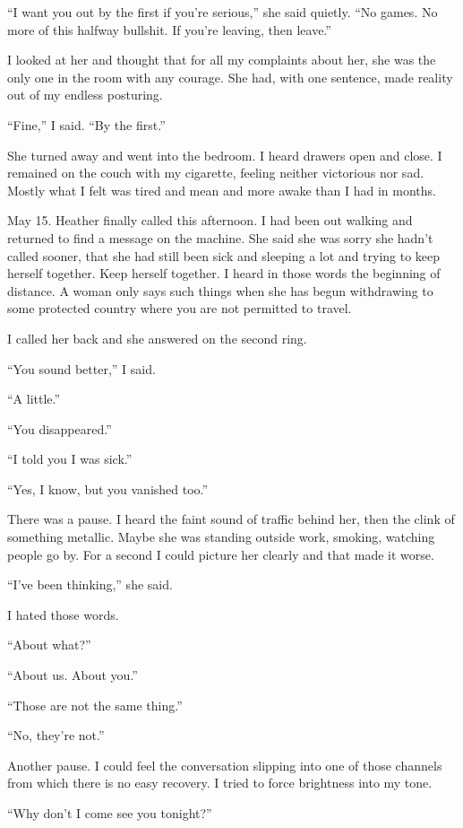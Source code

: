 ``I want you out by the first if you're serious,'' she said quietly.
``No games. No more of this halfway bullshit. If you're leaving, then
leave.''

I looked at her and thought that for all my complaints about her, she
was the only one in the room with any courage. She had, with one
sentence, made reality out of my endless posturing.

``Fine,'' I said. ``By the first.''

She turned away and went into the bedroom. I heard drawers open and
close. I remained on the couch with my cigarette, feeling neither
victorious nor sad. Mostly what I felt was tired and mean and more awake
than I had in months.

May 15. Heather finally called this afternoon. I had been out walking
and returned to find a message on the machine. She said she was sorry
she hadn't called sooner, that she had still been sick and sleeping a
lot and trying to keep herself together. Keep herself together. I heard
in those words the beginning of distance. A woman only says such things
when she has begun withdrawing to some protected country where you are
not permitted to travel.

I called her back and she answered on the second ring.

``You sound better,'' I said.

``A little.''

``You disappeared.''

``I told you I was sick.''

``Yes, I know, but you vanished too.''

There was a pause. I heard the faint sound of traffic behind her, then
the clink of something metallic. Maybe she was standing outside work,
smoking, watching people go by. For a second I could picture her clearly
and that made it worse.

``I've been thinking,'' she said.

I hated those words.

``About what?''

``About us. About you.''

``Those are not the same thing.''

``No, they're not.''

Another pause. I could feel the conversation slipping into one of those
channels from which there is no easy recovery. I tried to force
brightness into my tone.

``Why don't I come see you tonight?''

